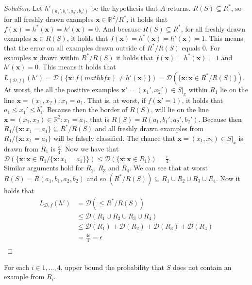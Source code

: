 \documentclass[10pt, a4paper, twoside]{amsart}
\newcommand{\R}{\ensuremath{\mathbb{R}}}
\newenvironment{solution}
               {\let\oldqedsymbol=\qedsymbol
                \renewcommand{\qedsymbol}{$\blacktriangleleft$}
                \begin{proof}[Solution]}
               {\end{proof}
                \renewcommand{\qedsymbol}{\oldqedsymbol}}
\begin{document}
\begin{solution}
  Let $h'_{(a_1',b_1',a_2',b_2')}$ be the hypothesis that $A$ returns. $R(S)\subseteq R^*$, so for all freshly drawn examples $\mathbf{x} \in \R^2/R^*$,  it holds that $f(\mathbf{x})=h^*(\mathbf{x}) = h'(\mathbf{x}) = 0$. And because $R(S)\subseteq R^*$, for all freshly drawn examples $\mathbf{x} \in R(S)$, it holds that $f(\mathbf{x})=h^*(\mathbf{x}) = h'(\mathbf{x}) = 1$. This means that the error on all examples drawn outside of $R^*/R(S)$ equals $0$. For examples $\mathbf{x}$ drawn within $R^*/R(S)$ it holds that $f(\mathbf{x})=h^*(\mathbf{x}) = 1$ and $h'(\mathbf{x}) = 0$. This means it holds that $L_{(\mathcal{D},f)}(h') = \mathcal{D}(\{\mathbf{x}: f(mathbf{x}) \neq h'(\mathbf{x})\}) = \mathcal{D}(\{\mathbf{x}:\mathbf{x}\in R^*/R(S)\})$. \\
  At worst, the all the positive examples $\mathbf{x'} = (x_1',x_2') \in S|_x$ within $R_1$ lie on the line $\mathbf{x}=(x_1,x_2):x_1 = a_1$. That is, at worst, if $f(\mathbf{x'} = 1)$, it holds that $a_1\leq x_1' \leq b_1^*$. Because then the border of $R(S)$, will lie on the line $\mathbf{x} = (x_1,x_2) \in \R^2: x_1 = a_1$, that is $R(S) = R(a_1,b_1',a_2',b_2')$. Because then $R_{1}/\{\mathbf{x}:x_1=a_1\} \subseteq R^*/R(S)$ and all freshly drawn examples from $R_{1}/\{\mathbf{x}:x_1=a_1\}$ will be falsely classified. The chance that $\mathbf{x} = (x_1,x_2) \in S|_x$ is drawn from $R_1$ is $\frac{\epsilon}{4}$. Now we have that $\mathcal{D}(\{\mathbf{x}: \mathbf{x} \in R_{1}/\{\mathbf{x}:x_1=a_1\}\}) \leq \mathcal{D}(\{\mathbf{x}: \mathbf{x} \in R_{1}\}) = \frac{\epsilon}{4}$.\\
  Similar arguments hold for $R_2$, $R_3$ and $R_4$. We can see that at worst $R(S) = R(a_1,b_1,a_2,b_2)$ and so $(R^*/R(S)) \subseteq R_1 \cup R_2 \cup R_3 \cup R_4$. Now it holds that
\begin{align*}
  L_{\mathcal{D},f}(h') & = \mathcal{D}(\leq R^*/R(S)) \\
                      & \leq \mathcal{D}(R_1 \cup R_2 \cup R_3 \cup R_4) \\
                      & \leq \mathcal{D}(R_1) + \mathcal{D}(R_2) + \mathcal{D}(R_3) + \mathcal{D}(R_4)\\
 & = \frac{4\epsilon}{4} = \epsilon \\
\end{align*}  
\end{solution}
For each $i \in {1,\ldots,4}$, upper bound the probability that $S$ does not contain an example from $R_i$.\\
\end{document}
